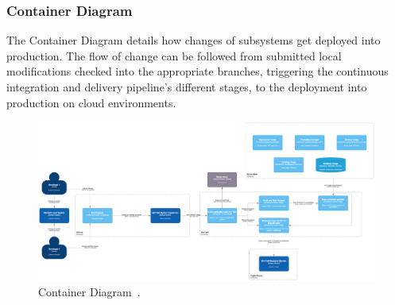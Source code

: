 \newpage
\subsubsection*{Container Diagram}

The Container Diagram details how changes of subsystems get deployed into production. The flow of change can be followed from submitted local modifications checked into the appropriate branches, triggering the continuous integration and delivery pipeline’s different stages, to the deployment into production on cloud environments.

\begin{figure}[h!]
    \centering
    \includegraphics[width=\linewidth,height=\textheight,keepaspectratio]{images/architectural_views/workflow_of_change.png}
    \caption{Container Diagram~\cite{containerDiagram}.}
    \label{fig:containerdiagram}
\end{figure}